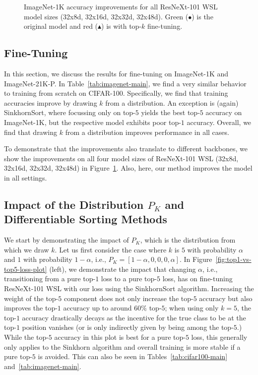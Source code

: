 \documentclass{article}
\begin{document}
\begin{figure}[t]
    \vspace{-2em}
    \caption{
        ImageNet-1K accuracy improvements for all ResNeXt-101 WSL model sizes (32x8d, 32x16d, 32x32d, 32x48d). Green ($\bullet$) is the original model and red ($\blacktriangle$) is with top-$k$ fine-tuning.
        }
    \label{fig:resnext-wsl-different-model-sizes-improvements-plot}
    \vspace*{-1em}
\end{figure}

\subsection{Fine-Tuning}

In this section, we discuss the results for fine-tuning on ImageNet-1K and ImageNet-21K-P.
In Table~\ref{tab:imagenet-main}, we find a very similar behavior to training from scratch on CIFAR-100.
Specifically, we find that training accuracies improve by drawing $k$ from a distribution. 
An exception is (again) SinkhornSort, where focussing only on top-$5$ yields the best top-$5$ accuracy on ImageNet-1K, but the respective model exhibits poor top-$1$ accuracy.
Overall, we find that drawing $k$ from a distribution improves performance in all cases.

To demonstrate that the improvements also translate to different backbones, we show the improvements on all four model sizes of ResNeXt-101 WSL (32x8d, 32x16d, 32x32d, 32x48d) in Figure~\ref{fig:resnext-wsl-different-model-sizes-improvements-plot}.
Also, here, our method improves the model in all settings.





\subsection{Impact of the Distribution $P_K$ and Differentiable Sorting Methods}

We start by demonstrating the impact of $P_K$, which is the distribution from which we draw $k$.
Let us first consider the case where $k$ is $5$ with probability $\alpha$ and $1$ with probability $1-\alpha$, i.e., $P_K=[1-\alpha, 0, 0, 0, \alpha]$.
In Figure~\ref{fig:top1-vs-top5-loss-plot} (left), we demonstrate the impact that changing $\alpha$, i.e., transitioning from a pure top-$1$ loss to a pure top-$5$ loss, has on fine-tuning ResNeXt-101 WSL with our loss using the SinkhornSort algorithm.
Increasing the weight of the top-$5$ component does not only increase the top-$5$ accuracy but also improves the top-$1$ accuracy up to around $60\%$ top-$5$; when using only $k=5$, the top-$1$ accuracy drastically decays as the incentive for the true class to be at the top-$1$ position vanishes (or is only indirectly given by being among the top-$5$.)
While the top-$5$ accuracy in this plot is best for a pure top-$5$ loss, this generally only applies to the Sinkhorn algorithm and overall training is more stable if a pure top-$5$ is avoided. 
This can also be seen in Tables~\ref{tab:cifar100-main} and~\ref{tab:imagenet-main}.
\end{document}
